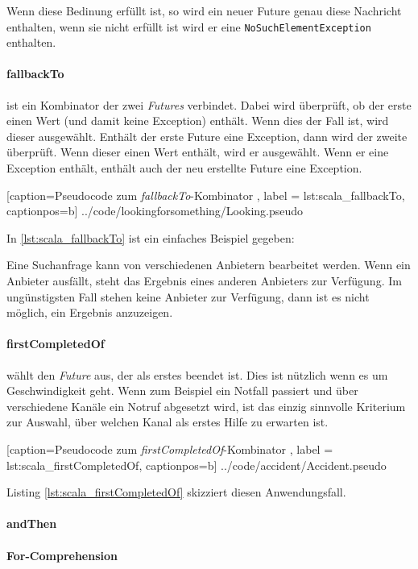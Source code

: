 Wenn diese Bedinung erfüllt ist, so wird ein neuer Future genau
diese Nachricht enthalten, wenn sie nicht erfüllt ist wird er eine
\texttt{NoSuchElementException} enthalten.

 
\paragraph{fallbackTo} ist ein Kombinator der zwei \emph{Futures}
verbindet. Dabei wird überprüft, ob der erste einen Wert (und damit
keine Exception) enthält. Wenn dies der Fall ist, wird dieser ausgewählt.
Enthält der erste Future eine Exception, dann wird der zweite überprüft.
Wenn dieser einen Wert enthält, wird er ausgewählt. Wenn er eine
Exception enthält, enthält auch der neu erstellte Future eine Exception.


    [caption={Pseudocode zum \emph{fallbackTo}-Kombinator },
       label = lst:scala_fallbackTo,
       captionpos=b]
 {../code/lookingforsomething/Looking.pseudo}
 
In \ref{lst:scala_fallbackTo} ist ein einfaches Beispiel gegeben:

Eine Suchanfrage kann von verschiedenen Anbietern bearbeitet werden. 
Wenn ein Anbieter ausfällt, steht das Ergebnis eines anderen Anbieters 
zur Verfügung. Im ungünstigsten Fall stehen keine Anbieter zur Verfügung, 
dann ist es nicht möglich, ein Ergebnis anzuzeigen.

\paragraph{firstCompletedOf} wählt den \emph{Future} aus, der als
erstes beendet ist. Dies ist nützlich wenn es um Geschwindigkeit
geht. Wenn zum Beispiel ein Notfall passiert und über verschiedene
Kanäle ein Notruf abgesetzt wird, ist das einzig sinnvolle Kriterium
zur Auswahl, über welchen Kanal als erstes Hilfe zu erwarten ist.


    [caption={Pseudocode zum \emph{firstCompletedOf}-Kombinator },
       label = lst:scala_firstCompletedOf,
       captionpos=b]
 {../code/accident/Accident.pseudo}
 
Listing \ref{lst:scala_firstCompletedOf} skizziert diesen
Anwendungsfall.

\paragraph{andThen}

\paragraph{For-Comprehension}
